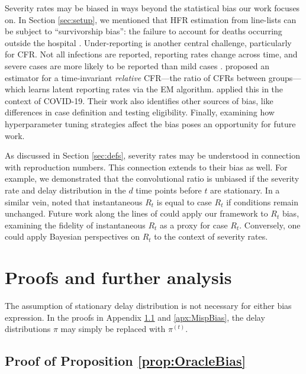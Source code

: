 \documentclass{article}
\begin{document}
Severity rates may be biased in ways beyond the statistical bias our work
focuses on. In Section \ref{sec:setup}, we mentioned that HFR estimation from
line-lists can be subject to ``survivorship bias'': the failure to account for 
deaths occurring outside the hospital \citep{lipsitch2015potential}.
Under-reporting is another central challenge, particularly for CFR. Not all
infections are reported, reporting rates change across time, and severe cases
are more likely to be reported than mild cases \citep{Tsang2021}. \citet{reich2012estimating}
proposed an estimator for a time-invariant \emph{relative} CFR---the ratio of
CFRs between groups---which learns latent reporting rates via the EM
algorithm. \citet{anastasios} applied this in the context of COVID-19. Their
work also identifies other sources of bias, like differences in case definition
and testing eligibility.  
Finally, examining how hyperparameter tuning strategies affect the bias poses an opportunity for future work.

As discussed in Section \ref{sec:defs}, severity rates may be understood in
connection with reproduction numbers. This connection extends to their bias as
well. For example, we  demonstrated that the convolutional ratio is unbiased if
the severity rate and delay distribution in the $d$ time points before $t$ are 
stationary. In a similar vein, \citet{fraser2007} noted that instantaneous $R_t$
is equal to case $R_t$ if conditions remain unchanged. Future work along the
lines of \citet{rt_study} could apply our framework to $R_t$ bias, examining the
fidelity of instantaneous $R_t$ as a proxy for case $R_t$.   
Conversely, one could apply Bayesian perspectives on $R_t$ to the context of severity rates.

\newpage



\clearpage
\appendix

\section{Proofs and further analysis}
\label{apx:proofs}
The assumption of stationary delay distribution is not necessary for either bias expression. 
In the proofs in Appendix \ref{apx:OracleBias} and \ref{apx:MispBias},
the delay distributions $\pi$ may simply be replaced with $\pi^{(t)}$.

\subsection{Proof of Proposition \ref{prop:OracleBias}}
\label{apx:OracleBias}
\end{document}
